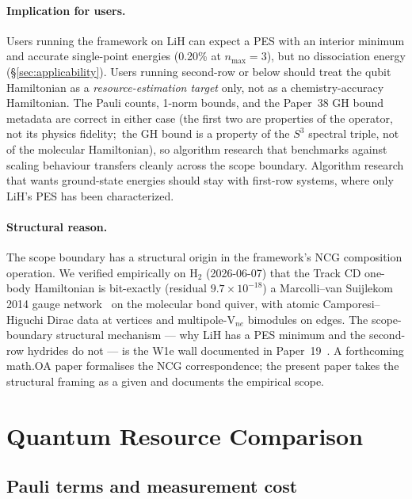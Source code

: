 \documentclass[twocolumn,pra,amsmath,amssymb,superscriptaddress]{revtex4-2}
\begin{document}
\paragraph{Implication for users.}  Users running the framework on LiH
can expect a PES with an interior minimum and accurate single-point
energies (0.20\% at $n_{\max}=3$), but no dissociation energy
(\S\ref{sec:applicability}).  Users running second-row or below should
treat the qubit Hamiltonian as a \emph{resource-estimation target}
only, not as a chemistry-accuracy Hamiltonian.  The Pauli counts,
1-norm bounds, and the Paper~38 GH bound metadata are correct in either
case (the first two are properties of the operator, not its physics
fidelity;\ the GH bound is a property of the $S^3$ spectral triple, not
of the molecular Hamiltonian), so
algorithm research that benchmarks against scaling behaviour transfers
cleanly across the scope boundary.  Algorithm research that wants
ground-state energies should stay with first-row systems, where only
LiH's PES has been characterized.

\paragraph{Structural reason.}  The scope boundary has a structural
origin in the framework's NCG composition operation.  We verified
empirically on H$_2$ (2026-06-07) that the Track CD
one-body Hamiltonian is bit-exactly (residual $9.7 \times 10^{-18}$) a
Marcolli--van Suijlekom 2014 gauge network~\cite{marcolli_vs2014} on
the molecular bond quiver, with atomic Camporesi--Higuchi Dirac data
at vertices and multipole-V$_{ne}$ bimodules on edges.  The
scope-boundary structural mechanism --- why LiH has a PES minimum and
the second-row hydrides do not --- is the W1e wall documented in
Paper~19~\cite{GeoVac_Paper19}.  A
forthcoming math.OA paper formalises the NCG correspondence; the
present paper takes the structural framing as a given and documents
the empirical scope.

\section{Quantum Resource Comparison}
\label{sec:resources}

\subsection{Pauli terms and measurement cost}
\end{document}
